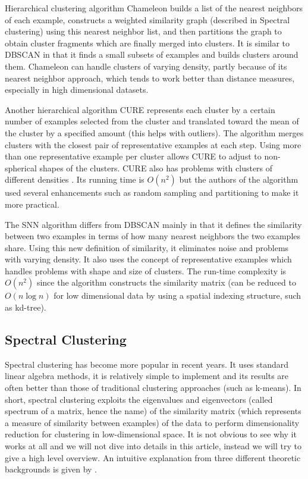 \documentclass[conference]{IEEEtran}
\begin{document}
Hierarchical clustering algorithm Chameleon \cite{karypis99} builds a list of the nearest
neighbors of each example, constructs a weighted similarity graph (described in Spectral clustering)
using this nearest neighbor list, and then partitions the graph to obtain cluster fragments
which are finally merged into clusters. It is similar to DBSCAN in that it finds a small subsets
of examples and builds clusters around them. Chameleon can handle clusters of varying density,
partly because of its nearest neighbor approach, which tends to work better than distance measures,
especially in high dimensional datasets.

Another hierarchical algorithm CURE \cite{guha98} represents each cluster by a certain
number of examples selected from the cluster and translated toward the mean of the cluster
by a specified amount (this helps with outliers). The algorithm merges clusters with
the closest pair of representative examples at each step. Using more than one representative
example per cluster allows CURE to adjust to non-spherical shapes of the clusters.
CURE also has problems with clusters of different densities \cite{ertoz03}. Its running
time is $O(n^2)$ but the authors of the algorithm used several enhancements such as
random sampling and partitioning to make it more practical.

The SNN algorithm \cite{ertoz03} differs from DBSCAN mainly in that it defines the similarity
between two examples in terms of how many nearest neighbors the two examples share.
Using this new definition of similarity, it eliminates noise and problems with varying density.
It also uses the concept of representative examples which handles problems with shape
and size of clusters. The run-time complexity is $O(n^2)$ since the algorithm constructs
the similarity matrix (can be reduced to $O(n \log n)$ for low dimensional data by using a spatial
indexing structure, such as kd-tree).


\subsection{Spectral Clustering}
Spectral clustering has become more popular in recent years. It uses standard linear algebra
methods, it is relatively simple to implement and its results are often better than those of
traditional clustering approaches (such as k-means). In short, spectral clustering exploits the
eigenvalues and eigenvectors (called spectrum of a matrix, hence the name) of the similarity matrix
(which represents
a measure of similarity between examples) of the data to perform dimensionality reduction for
clustering in low-dimensional space. It is not obvious to see why it works at all
and we will not dive into details in this article, instead we will try to give a high level overview.
An intuitive explanation from three different theoretic backgrounds is given by \cite{luxburg07}.
\end{document}
